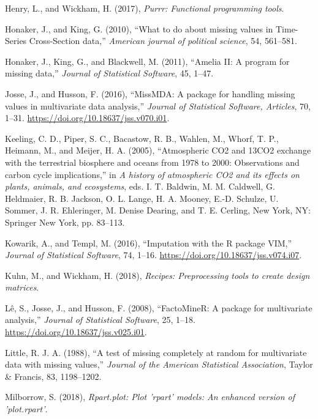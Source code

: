 \documentclass[]{article}
\theoremstyle{definition}
\theoremstyle{definition}
\theoremstyle{definition}
\theoremstyle{remark}
\begin{document}
\leavevmode\hypertarget{ref-purrr}{}%
Henry, L., and Wickham, H. (2017), \emph{Purrr: Functional programming
tools}.

\leavevmode\hypertarget{ref-Honaker2010}{}%
Honaker, J., and King, G. (2010), ``What to do about missing values in
Time-Series Cross-Section data,'' \emph{American journal of political
science}, 54, 561--581.

\leavevmode\hypertarget{ref-amelia}{}%
Honaker, J., King, G., and Blackwell, M. (2011), ``Amelia II: A program
for missing data,'' \emph{Journal of Statistical Software}, 45, 1--47.

\leavevmode\hypertarget{ref-missMDA}{}%
Josse, J., and Husson, F. (2016), ``MissMDA: A package for handling
missing values in multivariate data analysis,'' \emph{Journal of
Statistical Software, Articles}, 70, 1--31.
\url{https://doi.org/10.18637/jss.v070.i01}.

\leavevmode\hypertarget{ref-Keeling2005-scripps}{}%
Keeling, C. D., Piper, S. C., Bacastow, R. B., Wahlen, M., Whorf, T. P.,
Heimann, M., and Meijer, H. A. (2005), ``Atmospheric CO2 and 13CO2
exchange with the terrestrial biosphere and oceans from 1978 to 2000:
Observations and carbon cycle implications,'' in \emph{A history of
atmospheric CO2 and its effects on plants, animals, and ecosystems},
eds. I. T. Baldwin, M. M. Caldwell, G. Heldmaier, R. B. Jackson, O. L.
Lange, H. A. Mooney, E.-D. Schulze, U. Sommer, J. R. Ehleringer, M.
Denise Dearing, and T. E. Cerling, New York, NY: Springer New York, pp.
83--113.

\leavevmode\hypertarget{ref-VIM}{}%
Kowarik, A., and Templ, M. (2016), ``Imputation with the R package
VIM,'' \emph{Journal of Statistical Software}, 74, 1--16.
\url{https://doi.org/10.18637/jss.v074.i07}.

\leavevmode\hypertarget{ref-recipes}{}%
Kuhn, M., and Wickham, H. (2018), \emph{Recipes: Preprocessing tools to
create design matrices}.

\leavevmode\hypertarget{ref-FactoMineR}{}%
Lê, S., Josse, J., and Husson, F. (2008), ``FactoMineR: A package for
multivariate analysis,'' \emph{Journal of Statistical Software}, 25,
1--18. \url{https://doi.org/10.18637/jss.v025.i01}.

\leavevmode\hypertarget{ref-Little1988}{}%
Little, R. J. A. (1988), ``A test of missing completely at random for
multivariate data with missing values,'' \emph{Journal of the American
Statistical Association}, Taylor \& Francis, 83, 1198--1202.

\leavevmode\hypertarget{ref-rpart-plot}{}%
Milborrow, S. (2018), \emph{Rpart.plot: Plot 'rpart' models: An enhanced
version of 'plot.rpart'}.
\end{document}
